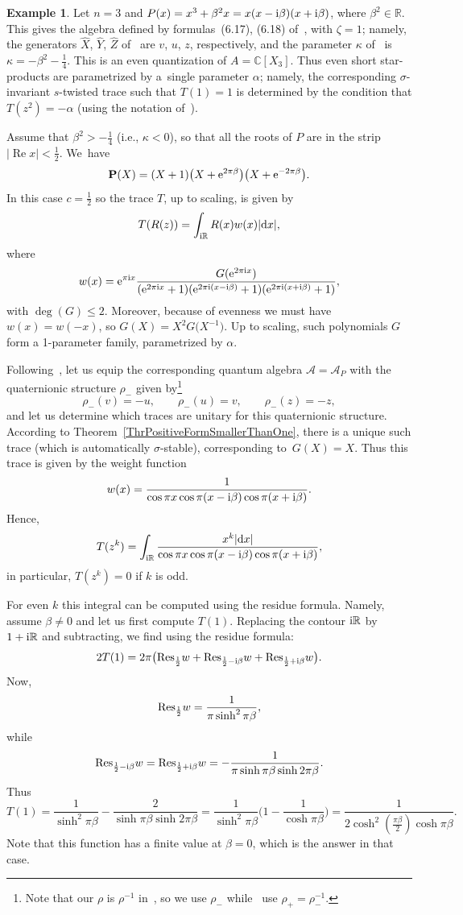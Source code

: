 \documentclass[10pt,a4paper]{amsart}
\newcommand{\mc}[1]{\mathcal{#1}}
\renewcommand{\Re}{\operatorname{Re}}
\theoremstyle{definition}
\newtheorem{Example}[Theorem]{Example}
\numberwithin{equation}{section}
\begin{document}
\begin{Example}
Let $n=3$ and $P(x)=x^3+\beta^2x=x(x-{\rm i}\beta )(x+{\rm i}\beta )$, where $\beta^2\in \mathbb R$.
This gives the algebra defined by formulas~(6.17), (6.18)
of~\cite{BPR}, with $\zeta=1$; namely,
the generators $\hat X$, $\hat Y$, $\hat Z$ of~\cite{BPR} are $v$, $u$, $z$, respectively, and the parameter $\kappa$ of~\cite{BPR} is $\kappa=-\beta^2-\frac{1}{4}$.
This is an even quantization of $A=\mathbb C[X_3]$. Thus even short star-products are parametrized by a~single parameter $\alpha$; namely, the corresponding $\sigma$-invariant $s$-twisted trace such that $T(1)=1$ is determined by the condition that $T(z^2)=-\alpha$ (using the notation of~\cite{BPR}).

Assume that $\beta^2>-\frac{1}{4}$ (i.e., $\kappa<0$), so that all the roots of $P$ are in the strip $|\Re x|<\frac{1}{2}$. We~have
\[
\mathbf{P}(X)=(X+1)\big(X+{\rm e}^{2\pi \beta}\big)\big(X+{\rm e}^{-2\pi \beta}\big).
\]
In this case $c=\frac{1}{2}$ so the trace $T$, up to scaling, is given by
\[
T(R(z))=\int_{{\rm i}\mathbb R}R(x)w(x)|{\rm d}x|,
\]
where
\[
w(x)={\rm e}^{\pi {\rm i}x}\frac{G({\rm e}^{2\pi {\rm i}x})}{({\rm e}^{2\pi {\rm i}x}+1)({\rm e}^{2\pi {\rm i}(x-{\rm i}\beta )}+1)({\rm e}^{2\pi {\rm i}(x+{\rm i}\beta )}+1)},
\]
with $\deg(G)\le 2$. Moreover, because of evenness we must have $w(x)=w(-x)$, so $G(X)=X^2G\big(X^{-1}\big)$. Up to scaling, such polynomials $G$ form a 1-parameter family, parametrized by $\alpha$.

Following~\cite[Section~6.3]{BPR}, let us equip the corresponding quantum algebra $\mc A=\mc A_P$ with the quaternionic structure $\rho_-$ given by\footnote{Note that our $\rho$ is $\rho^{-1}$ in~\cite{BPR}, so we use $\rho_-$ while~\cite{BPR} use $\rho_+=\rho_-^{-1}$.}
\[
\rho_-(v)=-u,\qquad \rho_-(u)=v,\qquad \rho_-(z)=-z,
\]
 and let us determine which traces are unitary
for this quaternionic structure. According to The\-o\-rem~\ref{ThrPositiveFormSmallerThanOne}, there is a unique
such trace (which is automatically $\sigma$-stable), corresponding to~$G(X)=X$. Thus this trace is given by the weight function
\[
w(x)=\frac{1}{\cos \pi x\cos \pi (x-{\rm i}\beta )\cos\pi(x+{\rm i}\beta )}.
\]
Hence,
\[
T(z^{k})=\int_{{\rm i}\mathbb R}\frac{x^{k}|{\rm d}x|}{\cos \pi x\cos \pi (x-{\rm i}\beta )\cos\pi(x+{\rm i}\beta )},
\]
in particular, $T(z^k)=0$ if $k$ is odd.

For even $k$ this integral can be computed using the residue formula. Namely, assume $\beta\ne 0$ and let us first compute $T(1)$. Replacing the contour ${\rm i}\mathbb R$ by $1+{\rm i}\mathbb R$ and subtracting,
we find using the residue formula:
\[
2T(1)=2\pi\big({\rm Res}_{\frac{1}{2}}w+{\rm Res}_{\frac{1}{2}-{\rm i}\beta }w+{\rm Res}_{\frac{1}{2}+{\rm i}\beta }w\big).
\]
Now,
\[
{\rm Res}_{\frac{1}{2}}w=\frac{1}{\pi\sinh^2\pi \beta},
\]
while
\[
{\rm Res}_{\frac{1}{2}-{\rm i}\beta }w={\rm Res}_{\frac{1}{2}+{\rm i}\beta }w=-\frac{1}{\pi \sinh \pi\beta \sinh 2\pi \beta}.
\]
Thus
\[
T(1)=\frac{1}{\sinh^2\pi \beta}-\frac{2}{\sinh \pi\beta \sinh 2\pi\beta }=
\frac{1}{\sinh^2\pi \beta}\bigg(1-\frac{1}{\cosh \pi\beta }\bigg)=\frac{1}{2\cosh^2(\frac{\pi\beta }{2})\cosh \pi\beta }.
\]
Note that this function has a finite value at $\beta=0$, which is the answer in that case.


\end{Example}
\end{document}
